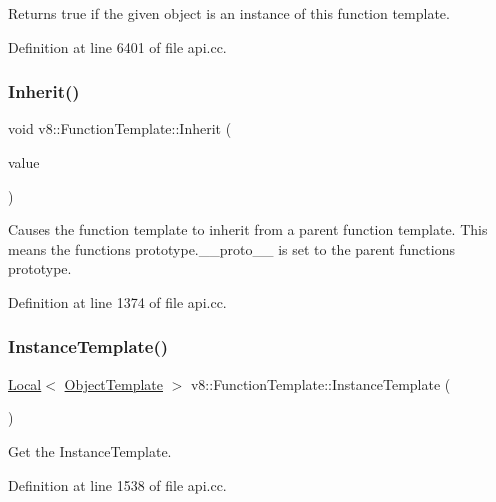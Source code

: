 Returns true if the given object is an instance of this function template. 

Definition at line 6401 of file api.\+cc.

\mbox{\label{classv8_1_1FunctionTemplate_abc11c462facf11bafd541892815c5425}} 
\subsubsection{\texorpdfstring{Inherit()}{Inherit()}}
{\footnotesize\ttfamily void v8\+::\+Function\+Template\+::\+Inherit (\begin{DoxyParamCaption}\item[{\mbox{\hyperlink{classv8_1_1Local}{v8\+::\+Local}}$<$ \mbox{\hyperlink{classv8_1_1FunctionTemplate}{Function\+Template}} $>$}]{value }\end{DoxyParamCaption})}

Causes the function template to inherit from a parent function template. This means the function\textquotesingle{}s prototype.\+\_\+\+\_\+proto\+\_\+\+\_\+ is set to the parent function\textquotesingle{}s prototype. 

Definition at line 1374 of file api.\+cc.

\mbox{\label{classv8_1_1FunctionTemplate_acc7ec612c5eb38e5f76f75eaf1efd776}} 
\subsubsection{\texorpdfstring{Instance\+Template()}{InstanceTemplate()}}
{\footnotesize\ttfamily \mbox{\hyperlink{classv8_1_1Local}{Local}}$<$ \mbox{\hyperlink{classv8_1_1ObjectTemplate}{Object\+Template}} $>$ v8\+::\+Function\+Template\+::\+Instance\+Template (\begin{DoxyParamCaption}{ }\end{DoxyParamCaption})}

Get the Instance\+Template. 

Definition at line 1538 of file api.\+cc.

